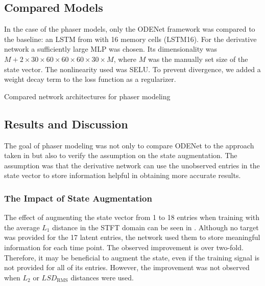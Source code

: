 \subsection{Compared Models}
\label{sec:phaser_models}

In the case of the phaser models, only the ODENet framework was compared to the baseline: an \ac{LSTM} from \cite{Wright2020} with 16 memory cells (\ac{LSTM}16). For the derivative network a sufficiently large \ac{MLP} was chosen. Its dimensionality was $M + 2 \times 30 \times 60 \times 60\times 60 \times 30\times M$, where $M$ was the manually set size of the state vector. The nonlinearity used was \ac{SELU}. To prevent divergence, we added a weight decay term to the loss function as a regularizer.

\begin{table}[]
    \caption{Compared network architectures for phaser modeling}
    \centering
    
    \label{tab:phaser_models_data}
\end{table}

\subsection{Results and Discussion}
\label{sec:phaser_results}

The goal of phaser modeling was not only to compare ODENet to the approach taken in \cite{Wright2020} but also to verify the assumption on the state augmentation. The assumption was that the derivative network can use the unobserved entries in the state vector to store information helpful in obtaining more accurate results.

\subsubsection{The Impact of State Augmentation}
The effect of augmenting the state vector from 1 to 18 entries when training with the average $L_1$ distance in the \ac{STFT} domain can be seen in . Although no target was provided for the 17 latent entries, the network used them to store meaningful information for each time point. The observed improvement is over two-fold. Therefore, it may be beneficial to augment the state, even if the training signal is not provided for all of its entries. However, the improvement was not observed when $L_2$ or $LSD_\text{RMS}$ distances were used.

